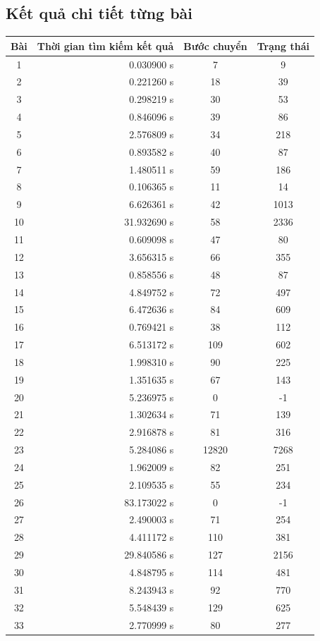 \documentclass[11pt,a4paper]{article}
\begin{document}
\subsection{Kết quả chi tiết từng bài}
\begin{center}
	\begin{tabular}{|c|r|c|c|}
		\hline
		Bài & Thời gian tìm kiếm kết quả & Bước chuyển & Trạng thái \\ \hline
		1   & 0.030900 s	& 7		& 9 \\ \hline
		2   & 0.221260 s	& 18	& 39 \\ \hline
		3	& 0.298219 s	& 30	& 53 \\ \hline
		4 	& 0.846096 s	& 39	& 86 \\ \hline
		5	& 2.576809 s	& 34	& 218 \\ \hline
		6	& 0.893582 s	& 40	& 87 \\ \hline
		7	& 1.480511 s	& 59	& 186 \\ \hline
		8	& 0.106365 s	& 11	& 14 \\ \hline
		9	& 6.626361 s	& 42	& 1013 \\ \hline
		10	& 31.932690 s	& 58	& 2336 \\ \hline
		11	& 0.609098 s	& 47	& 80 \\ \hline
		12	& 3.656315 s	& 66	& 355 \\ \hline
		13	& 0.858556 s	& 48	& 87 \\ \hline
		14	& 4.849752 s	& 72	& 497 \\ \hline
		15	& 6.472636 s	& 84	& 609 \\ \hline
		16	& 0.769421 s	& 38	& 112 \\ \hline
		17	& 6.513172 s	& 109	& 602 \\ \hline
		18	& 1.998310 s	& 90	& 225 \\ \hline
		19	& 1.351635 s	& 67	& 143 \\ \hline
		20	& 5.236975 s	& 0		& -1  \\ \hline
		21	& 1.302634 s	& 71	& 139 \\ \hline
		22	& 2.916878 s	& 81	& 316 \\ \hline
		23	& 5.284086 s	& 12820	& 7268 \\ \hline
		24	& 1.962009 s	& 82	& 251 \\ \hline
		25	& 2.109535 s	& 55	& 234 \\ \hline
		26	& 83.173022 s	& 0		& -1 \\ \hline
		27	& 2.490003 s	& 71	& 254 \\ \hline
		28	& 4.411172 s	& 110	& 381 \\ \hline
		29	& 29.840586 s	& 127	& 2156 \\ \hline
		30	& 4.848795 s	& 114	& 481 \\ \hline
		31	& 8.243943 s	& 92	& 770 \\ \hline
		32	& 5.548439 s	& 129	& 625 \\ \hline
		33	& 2.770999 s	& 80	& 277 \\ \hline
	\end{tabular}	
\end{center}
\newpage
\end{document}
